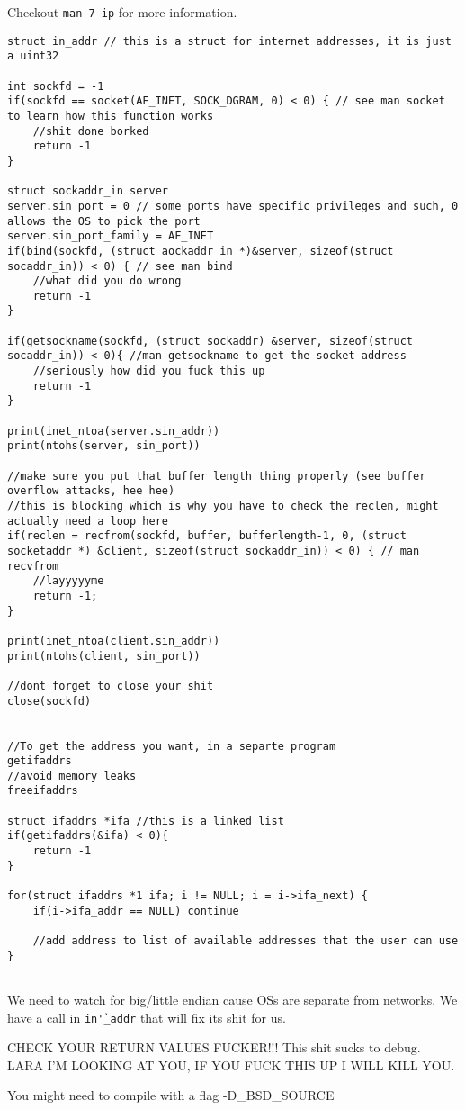 \documentclass[12pt]{article}
\begin{document}
Checkout \texttt{man 7 ip} for more information. 
\begin{lstlisting}
struct in_addr // this is a struct for internet addresses, it is just a uint32

int sockfd = -1
if(sockfd == socket(AF_INET, SOCK_DGRAM, 0) < 0) { // see man socket to learn how this function works
	//shit done borked
	return -1
}

struct sockaddr_in server
server.sin_port = 0 // some ports have specific privileges and such, 0 allows the OS to pick the port
server.sin_port_family = AF_INET 
if(bind(sockfd, (struct aockaddr_in *)&server, sizeof(struct socaddr_in)) < 0) { // see man bind
	//what did you do wrong
	return -1
}

if(getsockname(sockfd, (struct sockaddr) &server, sizeof(struct socaddr_in)) < 0){ //man getsockname to get the socket address
	//seriously how did you fuck this up
	return -1
}

print(inet_ntoa(server.sin_addr))
print(ntohs(server, sin_port))

//make sure you put that buffer length thing properly (see buffer overflow attacks, hee hee)
//this is blocking which is why you have to check the reclen, might actually need a loop here
if(reclen = recfrom(sockfd, buffer, bufferlength-1, 0, (struct socketaddr *) &client, sizeof(struct sockaddr_in)) < 0) { // man recvfrom
	//layyyyyme
	return -1;
}

print(inet_ntoa(client.sin_addr))
print(ntohs(client, sin_port))

//dont forget to close your shit
close(sockfd)


//To get the address you want, in a separte program
getifaddrs
//avoid memory leaks
freeifaddrs

struct ifaddrs *ifa //this is a linked list
if(getifaddrs(&ifa) < 0){
	return -1
}

for(struct ifaddrs *1 ifa; i != NULL; i = i->ifa_next) {
	if(i->ifa_addr == NULL) continue 

	//add address to list of available addresses that the user can use
}


\end{lstlisting}
We need to watch for big/little endian cause OSs are separate from networks. We have a call in \texttt{in\`'_addr} that will fix its shit for us. 

CHECK YOUR RETURN VALUES FUCKER!!! This shit sucks to debug. LARA I'M LOOKING AT YOU, IF YOU FUCK THIS UP I WILL KILL YOU.

You might need to compile with a flag -D_BSD_SOURCE 
\end{document}
